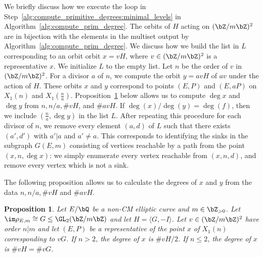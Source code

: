 \documentclass[11pt,reqno]{amsart}
\theoremstyle{plain}
\newtheorem{proposition}[theorem]{Proposition}
\theoremstyle{definition}
\newcommand{\Q}{\bQ}
\newcommand{\Z}{\bZ}
\begin{document}
We briefly discuss how we execute the loop in Step~\ref{alg:compute_primitive_degrees:minimal_levels} in Algorithm~\ref{alg:compute_prim_degree}. The orbits of $H$ acting on $(\Z/m\Z)^2$ are in bijection with the elements in the multiset output by Algorithm~\ref{alg:compute_prim_degree}. We discuss how we build the list in $L$ corresponding to an orbit orbit $x=vH$, where $v\in (\Z/m\Z)^2$ is a representative $x$. We initialize $L$ to the empty list. Let $n$ be the order of $v$ in $(\Z/m\Z)^2$. For a divisor $a$ of $n$, we compute the orbit $y=avH$ of $av$ under the action of $H$. These orbits $x$ and $y$ correspond to points $(E,P)$ and $(E,aP)$ on $X_1(n)$ and $X_1(\frac{n}{a})$. Proposition~\ref{prop:compute_degrees} below allows us to compute $\deg x$ and $\deg y$ from $n,n/a,\#vH$, and $\#avH$.  If  $\deg(x)/\deg(y)=\deg(f)$, then we include $(\frac{n}{a},\deg y)$  in the list $L$. 
After repeating this procedure for each divisor of $n$,  we remove every element $( a,d)$ of $L$ such that there exists $( a',d') $ with $a'|a$ and $a'\not=a$. This corresponds to identifying the 
sinks in the subgraph $G(E,m)$ consisting of vertices reachable by a path from the point $(x,n,\deg x)$: we simply enumerate every vertex reachable from $(x,n,d)$, and remove every vertex which is not a sink. 

The following proposition allows us to calculate the degrees of $x$ and $y$ from the data $n,n/a,\#vH$ and $\#avH$. 

\begin{proposition}\label{prop:compute_degrees}
Let $E/\Q$ be a non-CM elliptic curve and $m \in \Z_{>0}$. Let $\im \rho_{E,m} \cong G \leq \GL_2(\Z/m\Z)$ and let $H=\langle G,-I\rangle$. Let $v\in (\Z/m\Z)^2$ have order $n|m$ and let $(E,P)$ be a representative of the point $x$ of $X_1(n)$  corresponding to $vG$. If $n>2$, the degree of $x$ is $\#vH/2$. If $n\leq 2$, the degree of $x$ is 
$\#vH=\#vG$. 
\end{proposition}
\end{document}
